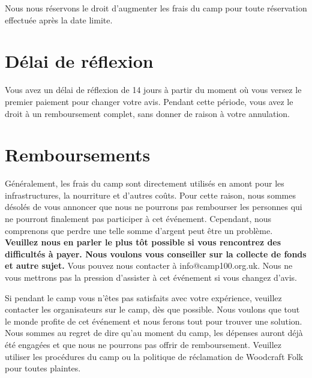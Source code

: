 \documentclass[a4paper, 11pt]{report}
\begin{document}
Nous nous r\'eservons le droit d'augmenter les frais du camp pour toute r\'eservation effectu\'ee apr\`es la date limite. 


\section{D\'elai de r\'eflexion}
Vous avez un d\'elai de r\'eflexion de 14 jours \`a partir du moment où vous versez le premier paiement pour changer votre avis. Pendant cette p\'eriode, vous avez le droit \`a un remboursement complet, sans donner de raison \`a votre annulation.

\section{Remboursements}
G\'en\'eralement, les frais du camp sont directement utilis\'es en amont pour les infrastructures, la nourriture et d'autres coûts. Pour cette raison, nous sommes d\'esol\'es de vous annoncer que nous ne pourrons pas rembourser les personnes qui ne pourront finalement pas participer \`a cet \'ev\'enement. Cependant, nous comprenons que perdre une telle somme d'argent peut être un probl\`eme. \textbf{Veuillez nous en parler le plus t\^ot possible si vous rencontrez des difficult\'es \`a payer. Nous voulons vous conseiller sur la collecte de fonds et autre sujet.} Vous pouvez nous contacter \`a info@camp100.org.uk. Nous ne vous mettrons pas la pression d'assister \`a cet \'ev\'enement si vous changez d'avis.
 
Si pendant le camp vous n'êtes pas satisfaits avec votre exp\'erience, veuillez contacter les organisateurs sur le camp, d\`es que possible. Nous voulons que tout le monde profite de cet \'ev\'enement et nous ferons tout pour trouver une solution. Nous sommes au regret de dire qu'au moment du camp, les d\'epenses auront d\'ej\`a \'et\'e engag\'ees et que nous ne pourrons pas offrir de remboursement. Veuillez utiliser les proc\'edures du camp ou la politique de r\'eclamation de Woodcraft Folk pour toutes plaintes.


\makedocumentbackpage
\end{document}
